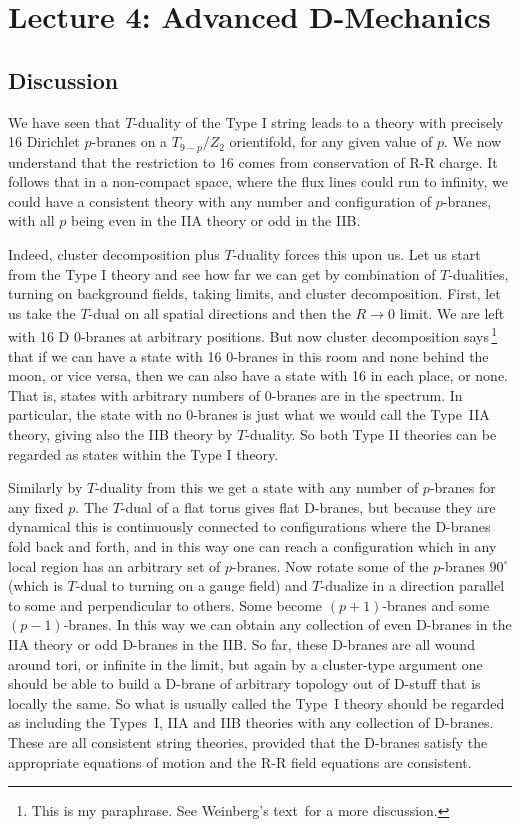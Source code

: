 \section{Lecture 4: Advanced D-Mechanics}

\subsection{Discussion}

We have seen that $T$-duality of the Type I string leads to a theory with
precisely 16 Dirichlet $p$-branes on a $T_{9-p}/Z_2$ orientifold, for any
given value of $p$.
We now understand that the restriction to 16 comes
from conservation of R-R charge.  It follows that in a non-compact space,
where the flux lines could run to infinity, we could have a consistent
theory with any number and configuration of $p$-branes, with all $p$
being even in the IIA theory or odd in the IIB.  

Indeed, cluster
decomposition plus $T$-duality forces this upon us.  Let us start from the
Type I theory and see how far we can get by combination of $T$-dualities,
turning on background fields, taking limits, and cluster decomposition.
First, let us take the $T$-dual on all spatial directions and then the
$R\to 0$ limit.  We are left with 16 D 0-branes at arbitrary positions. 
But now cluster decomposition says\,\footnote
{This is my paraphrase.  See Weinberg's text\,\cite{weinberg} for a more
discussion.} that if we can have a state with 16 0-branes in this room and
none behind the moon, or vice versa, then we can also have a state with 16
in each place, or none.  That is, states with arbitrary numbers of 0-branes
are in the spectrum.  In particular, the state with no 0-branes is just
what we would call the Type~IIA theory, giving also the IIB theory by
$T$-duality.  So both Type II theories can be regarded as states within the
Type I theory.

Similarly by $T$-duality from this we get a state with any number of
$p$-branes for any fixed $p$.  The $T$-dual of a
flat torus gives flat D-branes, but because they are dynamical this is
continuously connected to configurations where the D-branes fold back and
forth, and in this way one can reach a configuration which in any local
region has an arbitrary set of $p$-branes.  Now rotate some of the
$p$-branes
$90^\circ$ (which is $T$-dual to turning on a gauge field) and 
$T$-dualize in a direction parallel to some and perpendicular to others. 
Some become $(p+1)$-branes and some $(p-1)$-branes.  In this way we can
obtain any collection of even D-branes in the IIA theory or odd D-branes
in the IIB.  So far, these D-branes are all wound around tori, or infinite
in the limit, but again by a cluster-type argument one should be able to
build a D-brane of arbitrary topology out of D-stuff that is locally the
same.  So what is usually called the Type~I theory should be regarded as
including the Types~I, IIA and IIB theories with any collection of D-branes.
These are all consistent string theories, provided that the D-branes
satisfy the appropriate equations of motion and the R-R field equations
are consistent. 

